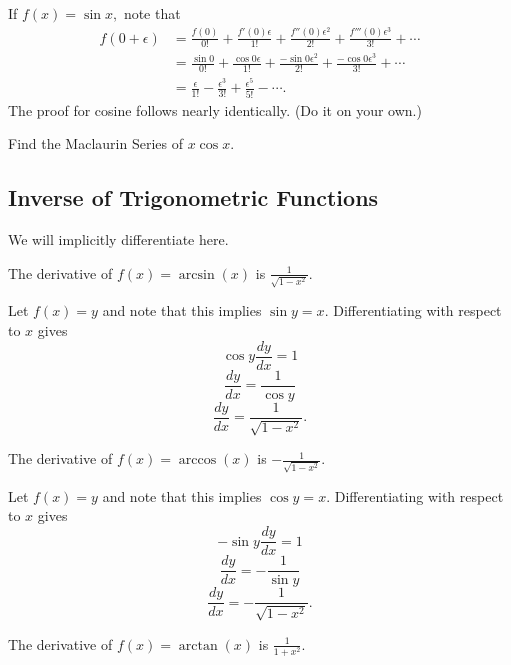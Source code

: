 \documentclass[blue,onecol]{shooting}
\begin{document}
\begin{pro}
If $f(x)=\sin x,$ note that
\begin{align*}
f(0+\epsilon)&=\frac{f(0)}{0!}+\frac{f'(0)\epsilon}{1!}+\frac{f''(0)\epsilon^2}{2!}+\frac{f'''(0)\epsilon^3}{3!}+\cdots \\
&=\frac{\sin 0}{0!}+\frac{\cos 0\epsilon}{1!}+\frac{-\sin 0\epsilon^2}{2!}+\frac{-\cos 0\epsilon^3}{3!}+\cdots \\
&=\frac{\epsilon}{1!}-\frac{\epsilon^3}{3!}+\frac{\epsilon^5}{5!}-\cdots.
\end{align*}
The proof for cosine follows nearly identically. (Do it on your own.)
\end{pro}

\begin{exer}
Find the Maclaurin Series of $x\cos x.$
\end{exer}

\subsection{Inverse of Trigonometric Functions}

We will implicitly differentiate here.

\begin{theo}
The derivative of $f(x)=\arcsin(x)$ is $\frac{1}{\sqrt{1-x^2}}.$
\end{theo}

\begin{pro}
Let $f(x)=y$ and note that this implies $\sin y=x.$ Differentiating with respect to $x$ gives
\[\cos y\frac{dy}{dx}=1\]
\[\frac{dy}{dx}=\frac{1}{\cos y}\]
\[\frac{dy}{dx}=\frac{1}{\sqrt{1-x^2}}.\]
\end{pro}

\begin{theo}
The derivative of $f(x)=\arccos(x)$ is $-\frac{1}{\sqrt{1-x^2}}.$
\end{theo}

\begin{pro}
Let $f(x)=y$ and note that this implies $\cos y=x.$ Differentiating with respect to $x$ gives
\[-\sin y\frac{dy}{dx}=1\]
\[\frac{dy}{dx}=-\frac{1}{\sin y}\]
\[\frac{dy}{dx}=-\frac{1}{\sqrt{1-x^2}}.\]
\end{pro}

\begin{theo}
The derivative of $f(x)=\arctan(x)$ is $\frac{1}{1+x^2}.$
\end{theo}
\end{document}
